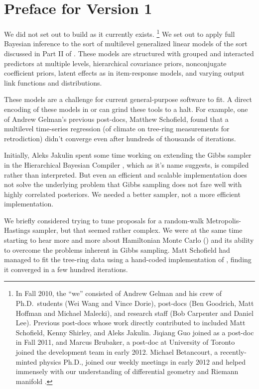 \chapter*{Preface for Version 1}

We did not set out to build \Stan as it currently exists.%
%
\footnote{In Fall 2010, the ``we'' consisted of Andrew Gelman and his
  crew of Ph.D.\ students (Wei Wang and Vince Dorie), post-docs (Ben
  Goodrich, Matt Hoffman and Michael Malecki), and research staff (Bob
  Carpenter and Daniel Lee).  Previous post-docs whose work directly
  contributed to \Stan included Matt Schofield, Kenny Shirley, and
  Aleks Jakulin.  Jiqiang Guo joined as a post-doc in Fall 2011, and
  Marcus Brubaker, a post-doc at University of Toronto joined the
  development team in early 2012.  Michael Betancourt, a
  recently-minted physics Ph.D., joined our weekly meetings in early
  2012 and helped immensely with our understanding of differential
  geometry and Riemann manifold \HMC.}
%
We set out to apply full Bayesian inference to the sort of multilevel
generalized linear models of the sort discussed in Part II of
\cite{GelmanHill:2007}.  These models are
structured with grouped and interacted predictors at multiple levels,
hierarchical covariance priors, nonconjugate coefficient priors,
latent effects as in item-response models, and varying output link
functions and distributions.

These models are a challenge for current general-purpose software to
fit.  A direct encoding of these models in \BUGS or \JAGS can grind
these tools to a halt.  For example, one of Andrew Gelman's previous
post-docs, Matthew Schofield, found that a multilevel time-series
regression (of climate on tree-ring measurements for retrodiction)
didn't converge even after hundreds of thousands of iterations.

Initially, Aleks Jakulin spent some time working on extending the
Gibbs sampler in the Hierarchical Bayesian Compiler
\cite{DaumeIII:2007}, which as it's name suggests, is compiled
rather than interpreted.  But even an efficient and scalable
implementation does not solve the underlying problem that Gibbs
sampling does not fare well with highly correlated posteriors.  We
needed a better sampler, not a more efficient implementation.

We briefly considered trying to tune proposals for a random-walk
Metropolis-Hastings sampler, but that seemed rather complex.  We were
at the same time starting to hear more and more about Hamiltonian
Monte Carlo (\HMC) and its ability to overcome the problems inherent
in Gibbs sampling.  Matt Schofield had managed to fit the tree-ring
data using a hand-coded implementation of \HMC, finding it converged
in a few hundred iterations.  

